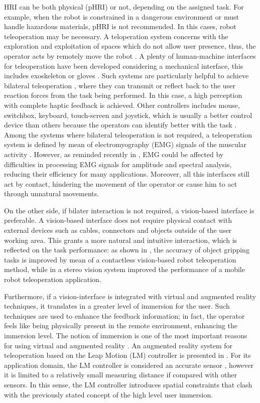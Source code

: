 \documentclass[letterpaper, 10 pt, conference]{ieeeconf}  %
\begin{document}
HRI can be both physical (pHRI) or not, depending on the assigned task. For example, when the robot is constrained in a dangerous environment or must handle hazardous materials, pHRI is not recommended. In this cases, robot teleoperation may be necessary. A teloperation system concerns with the exploration and exploitation of spaces which do not allow user presence, thus, the operator acts by remotely move the robot \cite{VERTUTJean}. A plenty of human-machine interfaces for teleoperation have been developed considering a mechanical interface, this includes exoskeleton \cite{Rebelo2014} or gloves \cite{Lv2006}. Such systems are particularly helpful to achieve bilateral teleoperation \cite{Hokayem2006}, where they can transmit or reflect back to the user reaction forces from the task being performed. In this case, a high perception with complete haptic feedback \cite{Glover2009} is achieved. Other controllers includes mouse, switchbox, keyboard, touch-screen and joystick, which is usually a better control device than others because the operators can identify better with the task \cite{Boboc2012}. Among the systems where bilateral teleoperation is not required, a teleoperation system is defined by mean of electromyography (EMG) signals of the muscular activity \cite{Vogel2011, Hassan2019}. However, as reminded recently in \cite{Roveda2018a}, EMG could be affected by difficulties in processing EMG signals for amplitude and spectral analysis, reducing their efficiency for many applications. Moreover, all this interfaces still act by contact, hindering the movement of the operator or cause him to act through unnatural movements.

On the other side, if bilater interaction is not required, a vision-based interface is preferable. A vision-based interface does not require physical contact with external devices such as cables, connectors and objects outside of the user working area. This grants a more natural and intuitive interaction, which is reflected on the task performance: as shown in \cite{Kofman2005}, the accuracy of object gripping tasks is improved by mean of a contactless vision-based robot teleoperation method, while in \cite{Livatino2009} a stereo vision system improved the performance of a mobile robot teleoperation application.

Furthermore, if a vision-interface is integrated with virtual and augmented reality techniques, it translates in a greater level of immersion for the user. Such techniques are used to enhance the feedback information; in fact, the operator feels like being physically present in the remote environment, enhancing the immersion level. The notion of immersion is one of the most important reasons for using virtual and augmented reality \cite{Boboc2012}. An augmented reality system for teleoperation based on the Leap Motion (LM) controller is presented in \cite{Peppoloni2015}. For its application domain, the LM controller is considered an accurate sensor \cite{Hedayati2018}, however it is limited to a relatively small measuring distance if compared with other sensors. In this sense, the LM controller introduces spatial constraints that clash with the previously stated concept of the high level user immersion.
\end{document}
